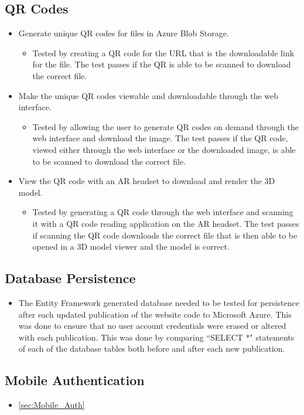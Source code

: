 \subsection{QR Codes}
\begin{itemize}
    \item Generate unique QR codes for files in Azure Blob Storage.
    \begin{itemize}
        \item Tested by creating a QR code for the URL that is the downloadable link for the file. The test passes if the QR is able to be scanned to download the correct file.
    \end{itemize}    

    \item Make the unique QR codes viewable and downloadable through the web interface.
    \begin{itemize}
        \item Tested by allowing the user to generate QR codes on demand through the web interface and download the image. The test passes if the QR code, viewed either through the web interface or the downloaded image, is able to be scanned to download the correct file.
    \end{itemize}    

    \item View the QR code with an AR headset to download and render the 3D model.
    \begin{itemize}
        \item Tested by generating a QR code through the web interface and scanning it with a QR code reading application on the AR headset. The test passes if scanning the QR code downloads the correct file that is then able to be opened in a 3D model viewer and the model is correct.
    \end{itemize} 
\end{itemize}


\subsection{Database Persistence}
\begin{itemize}
    \item The Entity Framework generated database needed to be tested for persistence after each updated publication of the website code to Microsoft Azure. This was done to ensure that no user account credentials were erased or altered with each publication.  This was done by comparing ``SELECT *" statements of each of the database tables both before and after each new publication.
\end{itemize}

\subsection{Mobile Authentication}
\begin{itemize} \item \ref{sec:Mobile_Auth} \end{itemize}

